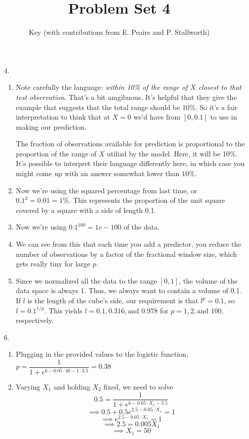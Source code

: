 \documentclass[11pt]{article}\usepackage[]{graphicx}\usepackage[]{color}
\author{Key (with contributions from E. Peairs and P. Stallworth)}
\title{Problem Set 4}
\begin{document}
\maketitle
\begin{enumerate}
\item[4.]
\begin{enumerate}[label=(\alph*)]
\item Note carefully the language: \emph{within 10\% of the range of $X$ closest to that test observation}. That's a bit amgibuous. It's helpful that they give the example that suggests that the total range should be 10\%. So it's a fair interpretation to think that at $X = 0$ we'd have from $[0, 0.1]$ to use in making our prediction.

The fraction of observations available for prediction is proportional to the proportion of the range of $X$ utilizd by the model. Here, it will be 10\%. It's possible to interpret their language differently here, in which case you might come up with an answer somewhat lower than $10\%$.
\item Now we're using the squared percentage from last time, or $0.1^2 = 0.01 = 1\%$. This represents the proportion of the unit square covered by a square with a side of length 0.1.
\item Now we're using $0.1^100 = 1e-100$ of the data.
\item We can see from this that each time you add a predictor, you reduce the number of observations by a factor of the fractional window size, which gets really tiny for large $p$.
\item Since we normalized all the data to the range $[0,1]$, the volume of the data space is always 1. Thus, we always want to contain a volume of 0.1. If $l$ is the length of the cube's side, our requirement is that $l^p = 0.1$, so $l = 0.1^{1/p}$. This yields $l = 0.1, 0.316, \textrm{and } 0.978$ for $p = 1, 2, \textrm{and } 100$, respectively.
\end{enumerate}
\item[6.]
\begin{enumerate}[label=(\alph*)]
\item Plugging in the provided values to the logistic function, $p=\dfrac{1}{1+e^{6-0.05\cdot 40 - 1 \cdot 3.5}} = 0.38$
\item Varying $X_1$ and holding $X_2$ fixed, we need to solve
\[ 0.5 = \dfrac{1}{1+e^{6 - 0.05 \cdot X_1 - 3.5}} \]
\[ \implies 0.5 + 0.5 e^{2.5 - 0.05 \cdot X_1 } = 1 \]
\[ \implies e^{2.5 - 0.05 \cdot X_1 } = 1\]
\[ \implies 2.5 = 0.005 X_1\]
\[ \implies X_1 = 50\]
\end{enumerate}


\end{enumerate}
\end{document}
